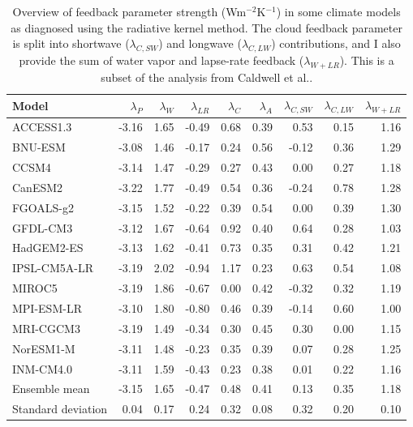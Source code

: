 \documentclass[12pt]{book}
\begin{document}
\begin{table}
  \caption{ Overview of feedback parameter strength (Wm$^{-2}$K$^{-1}$) in some climate models as diagnosed using the radiative kernel method. The cloud feedback parameter is split into shortwave ($\lambda_{C,SW}$) and longwave ($\lambda_{C,LW}$) contributions, and I also provide the sum of water vapor and lapse-rate feedback ($\lambda_{W+LR}$). This is a subset of the analysis from Caldwell et al.\cite{Caldwell2016}. }
  \vspace{0.5 cm}
  \centering
  \begin{tabular}{l|rrrrr|rr|r} 
Model                 & $\lambda_P$ & $\lambda_{W}$ & $\lambda_{LR}$ & $\lambda_{C}$ & $\lambda_A$ & $\lambda_{C,SW} $ & $\lambda_{C,LW}$  & $\lambda_{W+LR}$  \\
\hline
ACCESS1.3&	-3.16	&1.65&	-0.49&0.68&	0.39&	0.53&	0.15&	1.16 \\
BNU-ESM	& 	-3.08&1.46&	-0.17	&0.24&	0.56&	-0.12	&	0.36&	1.29 \\
CCSM4&	         -3.14&1.47&	-0.29	&0.27&	0.43&	0.00&	0.27&	1.18 \\
CanESM2& 	-3.22	&1.77&	-0.49	&0.54&	0.36&	-0.24	&	0.78&	1.28 \\
FGOALS-g2&	-3.15	&1.52&	-0.22	&0.39&	0.54&	0.00&	0.39&	1.30 \\
GFDL-CM3&	-3.12	&1.67&	-0.64	&0.92&	0.40&	0.64&	0.28&	1.03 \\
HadGEM2-ES&	-3.13	&1.62&	-0.41	&0.73&	0.35&	0.31&	0.42&	1.21 \\
IPSL-CM5A-LR	&-3.19&2.02&	-0.94	&1.17&	0.23&	0.63&	0.54&	1.08 \\
MIROC5& 	-3.19	&1.86&	-0.67	&0.00&	0.42&	-0.32	&	0.32&	1.19 \\
MPI-ESM-LR&	-3.10	&1.80&	-0.80	&0.46&	0.39&	-0.14	&	0.60&	1.00 \\
MRI-CGCM3&	-3.19	&1.49&	-0.34	&0.30&	0.45&	0.30&	0.00&	1.15 \\
NorESM1-M&	-3.11	&1.48&	-0.23	&0.35&	0.39&	0.07&	0.28&	1.25 \\
INM-CM4.0&	-3.11	&1.59&	-0.43	&0.23&	0.38&	0.01&	0.22&	1.16 \\
\hline								
Ensemble mean&	-3.15&	1.65&	-0.47&	0.48&	0.41&	0.13&	0.35&	1.18 \\
Standard deviation&	0.04&	0.17&	0.24&	0.32&	0.08&	0.32&	0.20&	0.10
  \end{tabular}
  \label{table:feedbacks}
\end{table}
\end{document}
